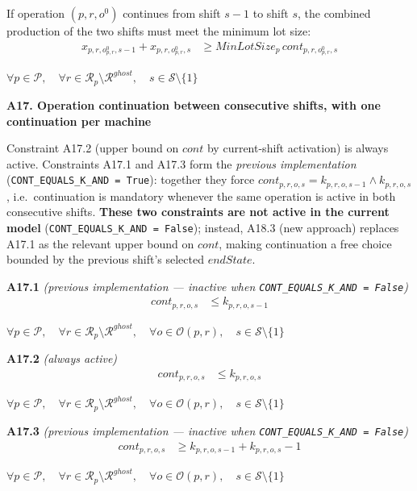 \documentclass{article}
\begin{document}
If operation $(p,r,o^0)$ continues from shift $s-1$ to shift $s$, the combined production of the two shifts must meet the minimum lot size:
\begin{align}
x_{p,r,o^0_{p,r},s-1}
+
x_{p,r,o^0_{p,r},s}
&\ge
MinLotSize_p \,
cont_{p,r,o^0_{p,r},s}
\label{eq:A16_min_lot_pair}
\end{align}
\begin{center}
$\forall p \in \mathcal{P}, \quad
\forall r \in \mathcal{R}_p \setminus \mathcal{R}^{ghost}, \quad
s \in \mathcal{S}\setminus\{1\}$
\end{center}

\noindent\textbf{A17. Operation continuation between consecutive shifts, with one continuation per machine}

Constraint A17.2 (upper bound on $cont$ by current-shift activation) is always active. Constraints A17.1 and A17.3 form the \emph{previous implementation} (\texttt{CONT\_EQUALS\_K\_AND = True}): together they force $cont_{p,r,o,s} = k_{p,r,o,s-1} \wedge k_{p,r,o,s}$, i.e.\ continuation is mandatory whenever the same operation is active in both consecutive shifts. \textbf{These two constraints are not active in the current model} (\texttt{CONT\_EQUALS\_K\_AND = False}); instead, A18.3 (new approach) replaces A17.1 as the relevant upper bound on $cont$, making continuation a free choice bounded by the previous shift's selected $endState$.

\noindent\textbf{A17.1} \emph{(previous implementation — inactive when \texttt{CONT\_EQUALS\_K\_AND = False})}
\begin{align}
cont_{p,r,o,s}
&\le
k_{p,r,o,s-1}
\label{eq:A17_cont_1}
\end{align}
\begin{center}
$\forall p \in \mathcal{P}, \quad
\forall r \in \mathcal{R}_p \setminus \mathcal{R}^{ghost}, \quad
\forall o \in \mathcal{O}(p,r), \quad
s \in \mathcal{S}\setminus\{1\}$
\end{center}

\noindent\textbf{A17.2} \emph{(always active)}
\begin{align}
cont_{p,r,o,s}
&\le
k_{p,r,o,s}
\label{eq:A17_cont_2}
\end{align}
\begin{center}
$\forall p \in \mathcal{P}, \quad
\forall r \in \mathcal{R}_p \setminus \mathcal{R}^{ghost}, \quad
\forall o \in \mathcal{O}(p,r), \quad
s \in \mathcal{S}\setminus\{1\}$
\end{center}

\noindent\textbf{A17.3} \emph{(previous implementation — inactive when \texttt{CONT\_EQUALS\_K\_AND = False})}
\begin{align}
cont_{p,r,o,s}
&\ge
k_{p,r,o,s-1}
+
k_{p,r,o,s}
- 1
\label{eq:A17_cont_3}
\end{align}
\begin{center}
$\forall p \in \mathcal{P}, \quad
\forall r \in \mathcal{R}_p \setminus \mathcal{R}^{ghost}, \quad
\forall o \in \mathcal{O}(p,r), \quad
s \in \mathcal{S}\setminus\{1\}$
\end{center}
\end{document}
